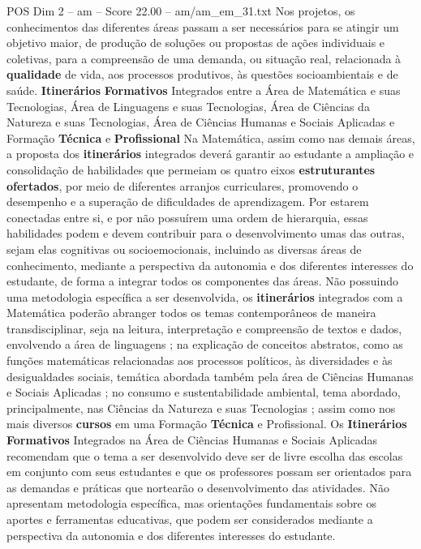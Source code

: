 \begin{textsample}{POS Dim 2 – am – Score 22.00 – am/am\_em\_31.txt}
Nos projetos, os conhecimentos das diferentes áreas passam a ser necessários para se atingir um objetivo maior, de produção de soluções ou propostas de ações individuais e coletivas, para a compreensão de uma demanda, ou situação real, relacionada à \textbf{qualidade} de vida, aos processos produtivos, às questões socioambientais e de saúde. \textbf{Itinerários} \textbf{Formativos} Integrados entre a Área de Matemática e suas Tecnologias, Área de Linguagens e suas Tecnologias, Área de Ciências da Natureza e suas Tecnologias, Área de Ciências Humanas e Sociais Aplicadas e Formação \textbf{Técnica} e \textbf{Profissional} Na Matemática, assim como nas demais áreas, a proposta dos \textbf{itinerários} integrados deverá garantir ao estudante a ampliação e consolidação de habilidades que permeiam os quatro eixos \textbf{estruturantes} \textbf{ofertados}, por meio de diferentes arranjos curriculares, promovendo o desempenho e a superação de dificuldades de aprendizagem.
Por estarem conectadas entre si, e por não possuírem uma ordem de hierarquia, essas habilidades podem e devem contribuir para o desenvolvimento umas das outras, sejam elas cognitivas ou socioemocionais, incluindo as diversas áreas de conhecimento, mediante a perspectiva da autonomia e dos diferentes interesses do estudante, de forma a integrar todos os componentes das áreas.
Não possuindo uma metodologia específica a ser desenvolvida, os \textbf{itinerários} integrados com a Matemática poderão abranger todos os temas contemporâneos de maneira transdisciplinar, seja na leitura, interpretação e compreensão de textos e dados, envolvendo a área de linguagens ; na explicação de conceitos abstratos, como as funções matemáticas relacionadas aos processos políticos, às diversidades e às desigualdades sociais, temática abordada também pela área de Ciências Humanas e Sociais Aplicadas ; no consumo e sustentabilidade ambiental, tema abordado, principalmente, nas Ciências da Natureza e suas Tecnologias ; assim como nos mais diversos \textbf{cursos} em uma Formação \textbf{Técnica} e Profissional.
Os \textbf{Itinerários} \textbf{Formativos} Integrados na Área de Ciências Humanas e Sociais Aplicadas recomendam que o tema a ser desenvolvido deve ser de livre escolha das escolas em conjunto com seus estudantes e que os professores possam ser orientados para as demandas e práticas que nortearão o desenvolvimento das atividades.
Não apresentam metodologia específica, mas orientações fundamentais sobre os aportes e ferramentas educativas, que podem ser considerados mediante a perspectiva da autonomia e dos diferentes interesses do estudante.

\end{textsample}

